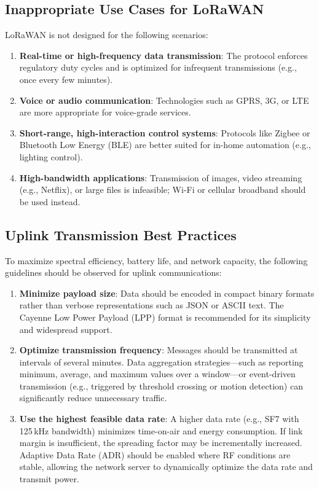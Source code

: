 \subsection{Inappropriate Use Cases for LoRaWAN}

LoRaWAN is not designed for the following scenarios:

\begin{enumerate}
    \item \textbf{Real-time or high-frequency data transmission}: The protocol enforces regulatory duty cycles and is optimized for infrequent transmissions (e.g., once every few minutes).
    \item \textbf{Voice or audio communication}: Technologies such as GPRS, 3G, or LTE are more appropriate for voice-grade services.
    \item \textbf{Short-range, high-interaction control systems}: Protocols like Zigbee or Bluetooth Low Energy (BLE) are better suited for in-home automation (e.g., lighting control).
    \item \textbf{High-bandwidth applications}: Transmission of images, video streaming (e.g., Netflix), or large files is infeasible; Wi-Fi or cellular broadband should be used instead.
\end{enumerate}

\subsection{Uplink Transmission Best Practices}

To maximize spectral efficiency, battery life, and network capacity, the following guidelines should be observed for uplink communications:

\begin{enumerate}
    \item \textbf{Minimize payload size}: Data should be encoded in compact binary formats rather than verbose representations such as JSON or ASCII text. The Cayenne Low Power Payload (LPP) format is recommended for its simplicity and widespread support.
    \item \textbf{Optimize transmission frequency}: Messages should be transmitted at intervals of several minutes. Data aggregation strategies—such as reporting minimum, average, and maximum values over a window—or event-driven transmission (e.g., triggered by threshold crossing or motion detection) can significantly reduce unnecessary traffic.
    \item \textbf{Use the highest feasible data rate}: A higher data rate (e.g., SF7 with 125\,kHz bandwidth) minimizes time-on-air and energy consumption. If link margin is insufficient, the spreading factor may be incrementally increased. Adaptive Data Rate (ADR) should be enabled where RF conditions are stable, allowing the network server to dynamically optimize the data rate and transmit power.
\end{enumerate}

